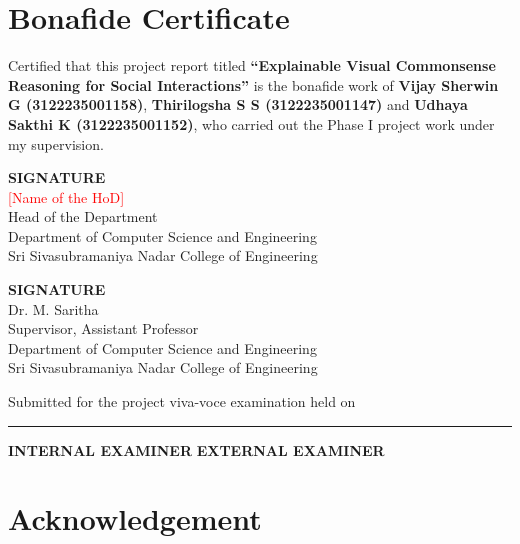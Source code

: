 \documentclass[12pt,a4paper,oneside]{report}
\newcommand{\fillin}[1]{\textcolor{red}{[#1]}}
\newcommand{\reporttitle}{Explainable Visual Commonsense Reasoning for Social Interactions}
\newcommand{\guidename}{Dr. M. Saritha}
\newcommand{\guidedesig}{Assistant Professor}
\newcommand{\hodname}{\fillin{Name of the HoD}}
\begin{document}
\setcounter{page}{2}

\chapter*{Bonafide Certificate}

Certified that this project report titled \textbf{``\reporttitle''} is the
bonafide work of \textbf{Vijay Sherwin G (3122235001158)},
\textbf{Thirilogsha S S (3122235001147)} and
\textbf{Udhaya Sakthi K (3122235001152)}, who carried out the Phase I project
work under my supervision.

\vspace{3cm}
\noindent
\begin{minipage}[t]{0.47\textwidth}
\textbf{SIGNATURE}\\[4pt]
\hodname\\
Head of the Department\\
Department of Computer Science and Engineering\\
Sri Sivasubramaniya Nadar College of Engineering
\end{minipage}\hfill
\begin{minipage}[t]{0.47\textwidth}
\textbf{SIGNATURE}\\[4pt]
\guidename\\
Supervisor, \guidedesig\\
Department of Computer Science and Engineering\\
Sri Sivasubramaniya Nadar College of Engineering
\end{minipage}

\vspace{2.5cm}
\noindent Submitted for the project viva-voce examination held on \rule{4cm}{0.4pt}

\vspace{2.5cm}
\noindent
\textbf{INTERNAL EXAMINER} \hfill \textbf{EXTERNAL EXAMINER}

\chapter*{Acknowledgement}
\end{document}
